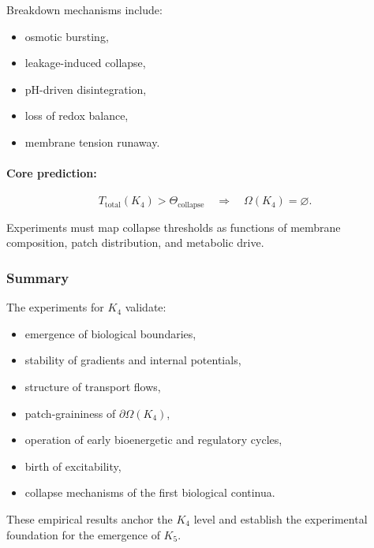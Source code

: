 Breakdown mechanisms include:

\begin{itemize}
    \item osmotic bursting,
    \item leakage-induced collapse,
    \item pH-driven disintegration,
    \item loss of redox balance,
    \item membrane tension runaway.
\end{itemize}

\paragraph{Core prediction:}

\[
   T_{\mathrm{total}}(K_4) > \Theta_{\mathrm{collapse}}
   \quad \Rightarrow \quad
   \Omega(K_4) = \varnothing.
\]

Experiments must map collapse thresholds as functions of membrane composition,
patch distribution, and metabolic drive.



\subsubsection{Summary}

The experiments for $K_4$ validate:

\begin{itemize}
    \item emergence of biological boundaries,
    \item stability of gradients and internal potentials,
    \item structure of transport flows,
    \item patch-graininess of $\partial\Omega(K_4)$,
    \item operation of early bioenergetic and regulatory cycles,
    \item birth of excitability,
    \item collapse mechanisms of the first biological continua.
\end{itemize}

These empirical results anchor the $K_4$ level and establish the
experimental foundation for the emergence of $K_5$.
